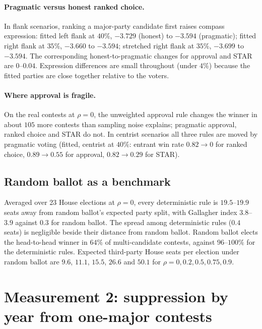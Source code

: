 \documentclass[11pt]{article}
\begin{document}
\paragraph{Pragmatic versus honest ranked choice.} In flank scenarios, ranking a major-party candidate first raises compass expression: fitted left flank at $40\%$, $-3.729$ (honest) to $-3.594$ (pragmatic); fitted right flank at $35\%$, $-3.660$ to $-3.594$; stretched right flank at $35\%$, $-3.699$ to $-3.594$. The corresponding honest-to-pragmatic changes for approval and STAR are $0$--$0.04$. Expression differences are small throughout (under $4\%$) because the fitted parties are close together relative to the voters.

\paragraph{Where approval is fragile.} On the real contests at $\rho=0$, the unweighted approval rule changes the winner in about $105$ more contests than sampling noise explains; pragmatic approval, ranked choice and STAR do not. In centrist scenarios all three rules are moved by pragmatic voting (fitted, centrist at $40\%$: entrant win rate $0.82\to0$ for ranked choice, $0.89\to0.55$ for approval, $0.82\to0.29$ for STAR).

\FloatBarrier
\subsection{Random ballot as a benchmark}
Averaged over 23 House elections at $\rho=0$, every deterministic rule is $19.5$--$19.9$ seats away from random ballot's expected party split, with Gallagher index $3.8$--$3.9$ against $0.3$ for random ballot. The spread among deterministic rules ($0.4$ seats) is negligible beside their distance from random ballot. Random ballot elects the head-to-head winner in $64\%$ of multi-candidate contests, against $96$--$100\%$ for the deterministic rules. Expected third-party House seats per election under random ballot are $9.6$, $11.1$, $15.5$, $26.6$ and $50.1$ for $\rho=0, 0.2, 0.5, 0.75, 0.9$.

\section{Measurement 2: suppression by year from one-major contests}
\label{sec:suppression}

\FloatBarrier
\end{document}

